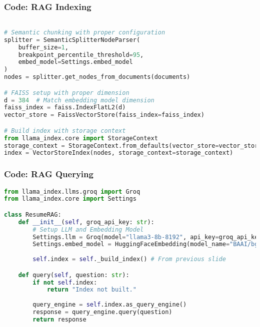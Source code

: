 \begin{frame}[fragile]\frametitle{Code: RAG Indexing}
    \begin{lstlisting}[language=Python, basicstyle=\tiny, caption={llm\_llamaindex\_rag.py - Building the Index}]

# Semantic chunking with proper configuration
splitter = SemanticSplitterNodeParser(
    buffer_size=1,
    breakpoint_percentile_threshold=95,
    embed_model=Settings.embed_model
)
nodes = splitter.get_nodes_from_documents(documents)

# FAISS setup with proper dimension
d = 384  # Match embedding model dimension
faiss_index = faiss.IndexFlatL2(d)
vector_store = FaissVectorStore(faiss_index=faiss_index)

# Build index with storage context
from llama_index.core import StorageContext
storage_context = StorageContext.from_defaults(vector_store=vector_store)
index = VectorStoreIndex(nodes, storage_context=storage_context)
    \end{lstlisting}
\end{frame}


\begin{frame}[fragile]\frametitle{Code: RAG Querying}
    \begin{lstlisting}[language=Python, basicstyle=\tiny, caption={llm\_llamaindex\_rag.py - Querying}]
from llama_index.llms.groq import Groq
from llama_index.core import Settings

class ResumeRAG:
    def __init__(self, groq_api_key: str):
        # Setup LLM and Embedding Model
        Settings.llm = Groq(model="llama3-8b-8192", api_key=groq_api_key)
        Settings.embed_model = HuggingFaceEmbedding(model_name="BAAI/bge-small-en-v1.5")
        
        self.index = self._build_index() # From previous slide

    def query(self, question: str):
        if not self.index:
            return "Index not built."
            
        query_engine = self.index.as_query_engine()
        response = query_engine.query(question)
        return response
    \end{lstlisting}
\end{frame}

